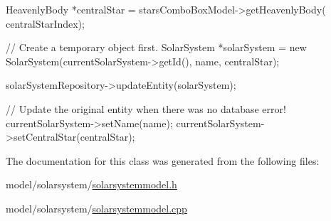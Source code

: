 \begin{DoxyCode}
{
    HeavenlyBody *centralStar = starsComboBoxModel->getHeavenlyBody(
      centralStarIndex);

    // Create a temporary object first.
    SolarSystem *solarSystem = new SolarSystem(currentSolarSystem->getId(), 
      name, centralStar);

    solarSystemRepository->updateEntity(solarSystem);

    // Update the original entity when there was no database error!
    currentSolarSystem->setName(name);
    currentSolarSystem->setCentralStar(centralStar);
}
\end{DoxyCode}


\-The documentation for this class was generated from the following files\-:\begin{DoxyCompactItemize}
\item 
model/solarsystem/\hyperlink{solarsystemmodel_8h}{solarsystemmodel.\-h}\item 
model/solarsystem/\hyperlink{solarsystemmodel_8cpp}{solarsystemmodel.\-cpp}\end{DoxyCompactItemize}
